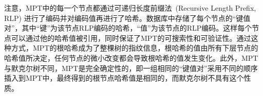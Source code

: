 注意，MPT中的每一个节点都通过可递归长度前缀法~\cite{RLPcode}(Recursive Length Prefix, RLP) 进行了编码并对编码值再进行了哈希。数据库中存储了每个节点的“键值对”，其中“键”为该节点RLP编码的哈希，“值”为该节点的RLP编码。这样每个节点可以通过他的哈希值被引用，同时保证了MPT的可搜索性和可验证性。通过这种方式，MPT的根哈希成为了整棵树的指纹信息，根哈希的值由所有下层节点的哈希值所决定，任何节点的微小改变都会导致根哈希的值发生变化。此外，MPT与默克尔树不同，MPT是完全确定性的，即一组相同的“键值对”采用不同的顺序插入到MPT中，最终得到的根节点哈希值是相同的，而默克尔树不具有这个性质。





